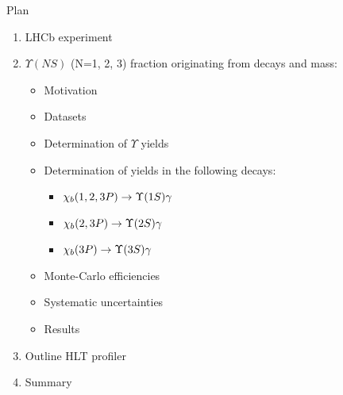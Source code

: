 \begin{frame}{Plan}
\begin{enumerate}
\item LHCb experiment
\item $\Upsilon(NS)$ (N=1, 2, 3) fraction  originating from \chib decays and \chibThreeP mass:
\begin{itemize}
\item Motivation
\item Datasets
\item Determination of $\Upsilon$ yields
\item Determination of \chib yields in the following decays:
\begin{itemize}
    \item $\chi_b(1,2,3P) \to \OneS \gamma$
    \item $\chi_b(2,3P) \to \TwoS \gamma$
    \item $\chi_b(3P) \to \ThreeS \gamma$
\end{itemize}
\item Monte-Carlo efficiencies
\item Systematic uncertainties 
\item Results
\end{itemize}
\item Outline HLT profiler
\item Summary
\end{enumerate}
\end{frame}
